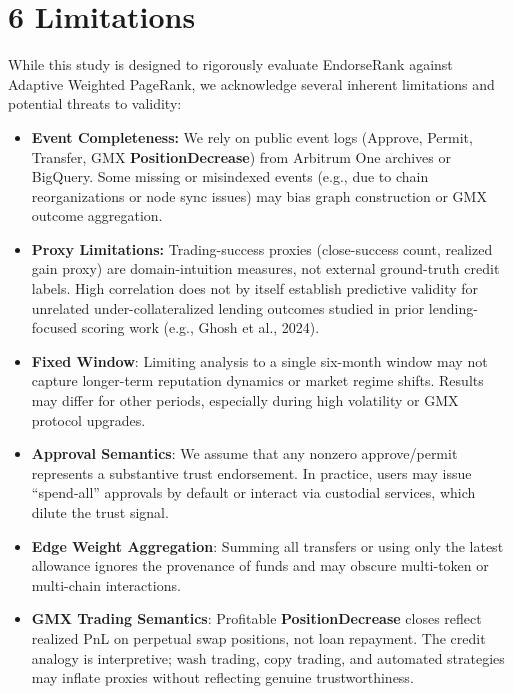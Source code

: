 \clearpage
{}
\section*{6 \textbf{Limitations}}
\label{sec:limitations}

While this study is designed to rigorously evaluate EndorseRank against Adaptive Weighted PageRank, we acknowledge several inherent limitations and potential threats to validity:



\begin{itemize}
\item[\textbullet] \textbf{Event Completeness:} We rely on public event logs (Approve, Permit, Transfer, GMX \textbf{PositionDecrease}) from Arbitrum One archives or BigQuery. Some missing or misindexed events (e.g., due to chain reorganizations or node sync issues) may bias graph construction or GMX outcome aggregation.
\item[\textbullet] \textbf{Proxy Limitations:} Trading-success proxies (close-success count, realized gain proxy) are domain-intuition measures, not external ground-truth credit labels. High correlation does not by itself establish predictive validity for unrelated under-collateralized lending outcomes studied in prior lending-focused scoring work (e.g., Ghosh et al., 2024).
\end{itemize}

\begin{itemize}
\item[\textbullet] \textbf{Fixed Window}: Limiting analysis to a single six-month window may not capture longer-term reputation dynamics or market regime shifts. Results may differ for other periods, especially during high volatility or GMX protocol upgrades.
\end{itemize}

\begin{itemize}
\item[\textbullet] \textbf{Approval Semantics}: We assume that any nonzero approve/permit represents a substantive trust endorsement. In practice, users may issue ``spend-all'' approvals by default or interact via custodial services, which dilute the trust signal.
\item[\textbullet] \textbf{Edge Weight Aggregation}: Summing all transfers or using only the latest allowance ignores the provenance of funds and may obscure multi-token or multi-chain interactions.
\item[\textbullet] \textbf{GMX Trading Semantics}: Profitable \textbf{PositionDecrease} closes reflect realized PnL on perpetual swap positions, not loan repayment. The credit analogy is interpretive; wash trading, copy trading, and automated strategies may inflate proxies without reflecting genuine trustworthiness.
\end{itemize}

